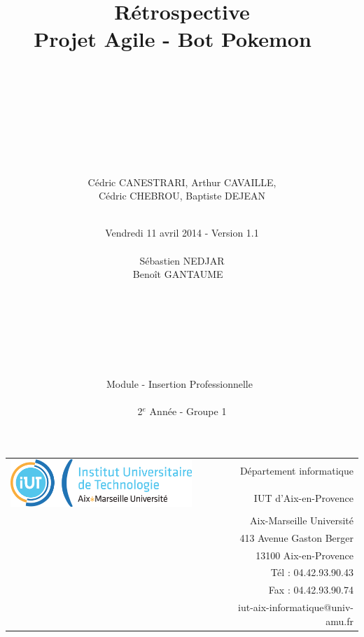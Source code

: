 \documentclass[12pt]{article}
\begin{document}
\title{ ~\\~\\~\\Rétrospective\\\small{Projet Agile - Bot Pokemon} ~\\~\\~\\~\\~\\}

\author{Cédric CANESTRARI, Arthur CAVAILLE,\\ Cédric CHEBROU, Baptiste DEJEAN}
\date{~\\Vendredi 11 avril 2014 - Version 1.1\\
	~\\
	Sébastien NEDJAR\\
	Benoît GANTAUME
	~\\~\\~\\~\\~\\~\\~\\
	~\\Module - Insertion Professionnelle~\\
	~\\2$^e$ Année - Groupe 1
	}
\footnotesize{
	\begin{tabular}{lp{2cm}r}
		  \multirow{2}{*}{\includegraphics[width=7cm]{LOGO-IUT-AMU.png}} && Département informatique \\
            && IUT d'Aix-en-Provence \\
            && Aix-Marseille Université \\
            && 413 Avenue Gaston Berger \\
            && 13100 Aix-en-Provence \\
            && Tél : 04.42.93.90.43 \\
            && Fax : 04.42.93.90.74 \\
            && iut-aix-informatique@univ-amu.fr 
    	\end{tabular}
}{\let\newpage\relax\maketitle} %
\newpage
{} %
\end{document}
